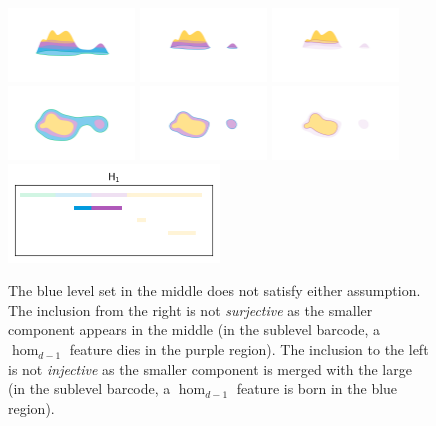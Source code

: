 \begin{figure}[htbp]
  \centering
  \includegraphics[trim=200 300 200 200, clip, width=0.3\textwidth]{scripts/figures/surf/ass2_B_side.png}
  \includegraphics[trim=200 300 200 200, clip, width=0.3\textwidth]{scripts/figures/surf/ass1_C_side.png}
  \includegraphics[trim=200 300 200 200, clip, width=0.3\textwidth]{scripts/figures/surf/ass1_D_side.png}
  \includegraphics[trim=300 100 200 200, clip, width=0.3\textwidth]{scripts/figures/surf/ass2_B_top.png}
  \includegraphics[trim=300 150 300 200, clip, width=0.3\textwidth]{scripts/figures/surf/ass1_C_top.png}
  \includegraphics[trim=300 150 300 200, clip, width=0.3\textwidth]{scripts/figures/surf/ass1_D_top.png}
  \includegraphics[width=0.5\textwidth]{scripts/figures/scalar_barcode_H1-masked.png}
  \caption{The blue level set in the middle does not satisfy either assumption.
    The inclusion from the right is not \emph{surjective} as the smaller component appears in the middle (in the sublevel barcode, a $\hom_{d-1}$ feature dies in the purple region).
    The inclusion to the left is not \emph{injective} as the smaller component is merged with the large (in the sublevel barcode, a $\hom_{d-1}$ feature is born in the blue region).}\label{fig:assumption1}
\end{figure}

